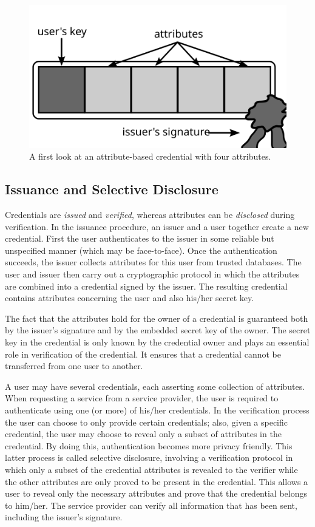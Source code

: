 \begin{figure}
  \centering
  \includegraphics[scale=.45]{images/credential}
  \caption{A first look at an attribute-based credential with four attributes.}
  \label{fig:Credential}
\end{figure}

\subsection{Issuance and Selective Disclosure}

Credentials are \emph{issued} and \emph{verified}, whereas attributes can be
\emph{disclosed} during verification. In the issuance procedure, an issuer and
a user together create a new credential. First the user authenticates to the
issuer in some reliable but unspecified manner (which may be face-to-face). Once
the authentication succeeds, the issuer collects attributes for this user from
trusted databases. The user and issuer then carry out a cryptographic protocol
in which the attributes are combined into a credential signed by the issuer. The
resulting credential contains attributes concerning the user and also his/her
secret key.

The fact that the attributes hold for the owner of a credential is guaranteed
both by the issuer's signature and by the embedded secret key of the owner. The
secret key in the credential is only known by the credential owner and plays an
essential role in verification of the credential. It ensures that a credential
cannot be transferred from one user to another.

A user may have several credentials, each asserting some collection of
attributes. When requesting a service from a service provider, the user is
required to authenticate using one (or more) of his/her credentials. In the
verification process the user can choose to only provide certain credentials;
also, given a specific credential, the user may choose to reveal only a subset
of attributes in the credential. By doing this, authentication becomes more
privacy friendly. This latter process is called selective disclosure, involving
a verification protocol in which only a subset of the credential attributes is
revealed to the verifier while the other attributes are only proved to be
present in the credential. This allows a user to reveal only the necessary
attributes and prove that the credential belongs to him/her. The service
provider can verify all information that has been sent, including the issuer's
signature.


